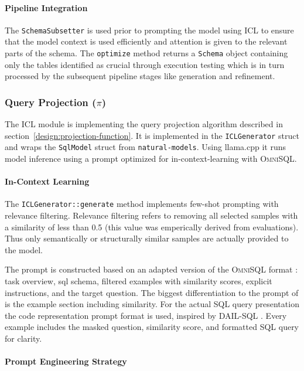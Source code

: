 \paragraph{Pipeline Integration}

The \texttt{SchemaSubsetter} is used prior to prompting the model using ICL to
ensure that the model context is used efficiently and attention is given to the
relevant parts of the schema. The \texttt{optimize} method returns a
\texttt{Schema} object containing only the tables identified as crucial through
execution testing which is in turn processed by the subsequent pipeline stages
like generation and refinement.

\subsubsection{Query Projection ($\pi$)}

The ICL module is implementing the query projection algorithm described in
section~\ref{design:projection-function}. It is implemented in the
\texttt{ICLGenerator} struct and wraps the \texttt{SqlModel} struct from
\texttt{natural-models}. Using llama.cpp it runs model inference using a
prompt optimized for in-context-learning with \textsc{OmniSQL}.

\paragraph{In-Context Learning}

The \texttt{ICLGenerator::generate} method implements few-shot prompting
with relevance filtering. Relevance filtering refers to removing all selected
samples with a similarity of less than 0.5 (this value was emperically derived
from evaluations). Thus only semantically or structurally similar samples are
actually provided to the model.

The prompt is constructed based on an adapted version of the \textsc{OmniSQL}
format \citep{OmniSQL}: task overview, sql schema, filtered examples with
similarity scores, explicit instructions, and the target question.
The biggest differentiation to the prompt of \citeauthor{OmniSQL} is the
example section including similarity. For the actual SQL query presentation the
code representation prompt format is used, inspired by DAIL-SQL
\citep{DAIL-SQL}. Every example includes the masked question, similarity score,
and formatted SQL query for clarity.

\paragraph{Prompt Engineering Strategy}

